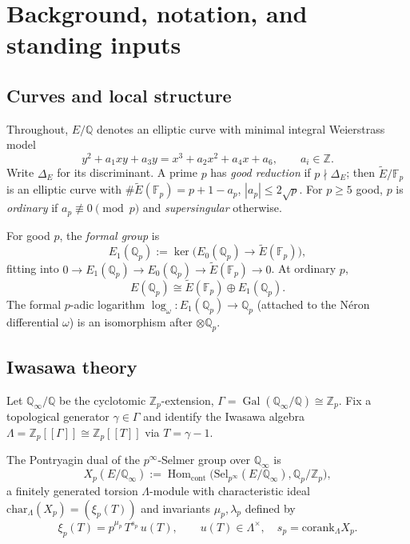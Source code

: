 \documentclass[12pt,reqno]{amsart}
\theoremstyle{definition}
\theoremstyle{remark}
\newcommand{\Q}{\mathbb{Q}}
\newcommand{\Z}{\mathbb{Z}}
\newcommand{\Fp}{\mathbb{F}_p}
\newcommand{\Qp}{\mathbb{Q}_p}
\newcommand{\Zp}{\mathbb{Z}_p}
\newcommand{\Qinf}{\Q_\infty}
\newcommand{\Lam}{\Lambda}
\newcommand{\chr}{\mathrm{char}}
\newcommand{\corank}{\mathrm{corank}}
\newcommand{\Sel}{\mathrm{Sel}}
\DeclareMathOperator{\Gal}{Gal}
\DeclareMathOperator{\Hom}{Hom}
\begin{document}
\section{Background, notation, and standing inputs}\label{sec:background}

\subsection{Curves and local structure}
Throughout, $E/\Q$ denotes an elliptic curve with minimal integral Weierstrass model
\begin{equation}\label{eq:weierstrass}
y^2+a_1xy+a_3y=x^3+a_2x^2+a_4x+a_6,\qquad a_i\in\Z.
\end{equation}
Write $\Delta_E$ for its discriminant. A prime $p$ has \emph{good reduction} if $p\nmid\Delta_E$; then $\widetilde E/\Fp$ is an elliptic curve with $\#\widetilde E(\Fp)=p+1-a_p$, $|a_p|\le 2\sqrt p$.  For $p\ge 5$ good, $p$ is \emph{ordinary} if $a_p\not\equiv 0\pmod p$ and \emph{supersingular} otherwise.

For good $p$, the \emph{formal group} is
\[
E_1(\Qp):=\ker\bigl(E_0(\Qp)\to\widetilde E(\Fp)\bigr),
\]
fitting into $0\to E_1(\Qp)\to E_0(\Qp)\to\widetilde E(\Fp)\to 0$.  At ordinary $p$,
\begin{equation}\label{eq:local-split}
E(\Qp)\cong\widetilde E(\Fp)\oplus E_1(\Qp).
\end{equation}
The formal $p$-adic logarithm $\log_\omega:E_1(\Qp)\to\Qp$ (attached to the N\'eron differential $\omega$) is an isomorphism after $\otimes\Qp$.

\subsection{Iwasawa theory}
Let $\Qinf/\Q$ be the cyclotomic $\Zp$-extension, $\Gamma=\Gal(\Qinf/\Q)\cong\Zp$.  Fix a topological generator $\gamma\in\Gamma$ and identify the Iwasawa algebra $\Lam=\Zp[\![\Gamma]\!]\cong\Zp[\![ T]\!]$ via $T=\gamma-1$.

The Pontryagin dual of the $p^\infty$-Selmer group over $\Qinf$ is
\[
X_p(E/\Qinf):=\Hom_{\mathrm{cont}}\bigl(\Sel_{p^\infty}(E/\Qinf),\Qp/\Zp\bigr),
\]
a finitely generated torsion $\Lam$-module with characteristic ideal $\chr_\Lam(X_p)=(\xi_p(T))$ and invariants $\mu_p,\lambda_p$ defined by
\begin{equation}\label{eq:xi-structure}
\xi_p(T)=p^{\mu_p}\,T^{s_p}\,u(T),\qquad u(T)\in\Lam^\times,\quad s_p=\corank_\Lam X_p.
\end{equation}
\end{document}
